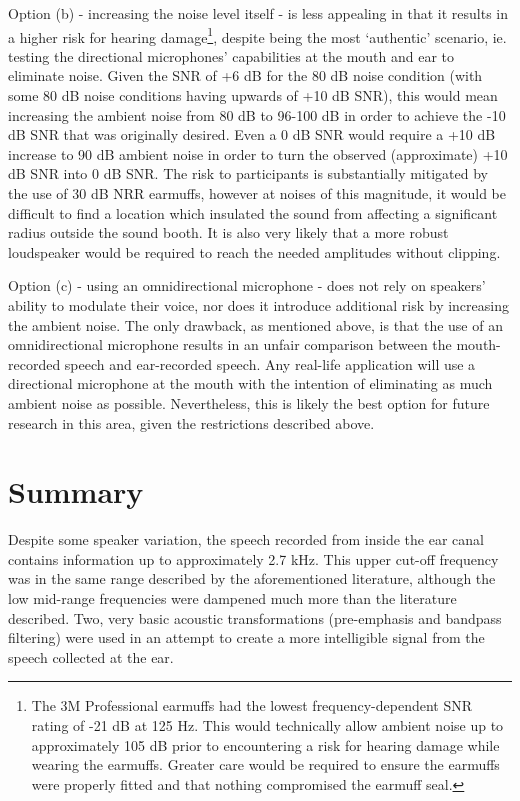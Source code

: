 Option (b) - increasing the noise level itself - is less appealing in that it results in a higher risk for hearing damage\footnote{The 3M Professional   earmuffs had the lowest frequency-dependent SNR rating of -21 dB at 125 Hz.  This would technically allow ambient noise up to approximately 105 dB prior to encountering a risk for hearing damage while wearing the   earmuffs.  Greater care would be required to ensure the   earmuffs were properly fitted and that nothing compromised the   earmuff seal.}, despite being the most `authentic' scenario, ie. testing the directional microphones' capabilities at the mouth and ear to eliminate noise.  Given the SNR of +6 dB for the 80 dB noise condition (with some 80 dB noise conditions having upwards of +10 dB SNR), this would mean increasing the ambient noise from 80 dB to 96-100 dB in order to achieve the -10 dB SNR that was originally desired.  Even a 0 dB SNR would require a +10 dB increase to 90 dB ambient noise in order to turn the observed (approximate) +10 dB SNR into 0 dB SNR. The risk to participants is substantially mitigated by the use of 30 dB NRR   earmuffs, however at noises of this magnitude, it would be difficult to find a location which insulated the sound from affecting a significant radius outside the sound booth.  It is also very likely that a more robust loudspeaker would be required to reach the needed amplitudes without clipping.

Option (c) - using an omnidirectional microphone - does not rely on speakers' ability to modulate their voice, nor does it introduce additional risk by increasing the ambient noise.  The only drawback, as mentioned above, is that the use of an omnidirectional microphone results in an unfair comparison between the mouth-recorded speech and ear-recorded speech.  Any real-life application will use a directional microphone at the mouth with the intention of eliminating as much ambient noise as possible.  Nevertheless, this is likely the best option for future research in this area, given the restrictions described above.

\section{Summary}\label{chap2:summary}

Despite some speaker variation, the speech recorded from inside the ear canal contains information up to approximately 2.7 kHz.  This upper cut-off frequency was in the same range described by the aforementioned literature, although the low mid-range frequencies were dampened much more than the literature described.  Two, very basic acoustic transformations (pre-emphasis and bandpass filtering) were used in an attempt to create a more intelligible signal from the speech collected at the ear.

